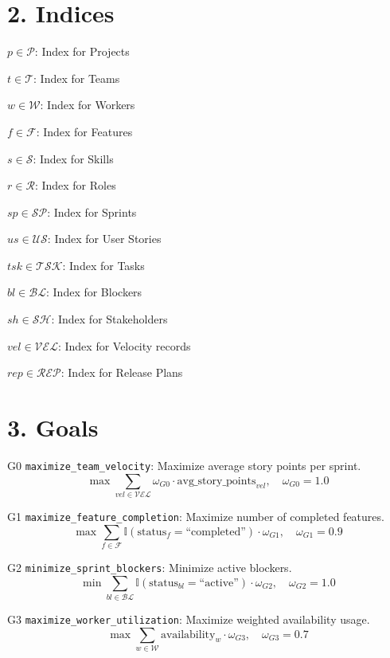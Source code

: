 \documentclass[12pt]{article}
\begin{document}
\section{2. Indices}
\item $ p \in \mathcal{P} $: Index for Projects
    \item $ t \in \mathcal{T} $: Index for Teams
    \item $ w \in \mathcal{W} $: Index for Workers
    \item $ f \in \mathcal{F} $: Index for Features
    \item $ s \in \mathcal{S} $: Index for Skills
    \item $ r \in \mathcal{R} $: Index for Roles
    \item $ sp \in \mathcal{SP} $: Index for Sprints
    \item $ us \in \mathcal{US} $: Index for User Stories
    \item $ tsk \in \mathcal{TSK} $: Index for Tasks
    \item $ bl \in \mathcal{BL} $: Index for Blockers
    \item $ sh \in \mathcal{SH} $: Index for Stakeholders
    \item $ vel \in \mathcal{VEL} $: Index for Velocity records
    \item $ rep \in \mathcal{REP} $: Index for Release Plans

\section{3. Goals}
\item[G0] \texttt{maximize\_team\_velocity}: Maximize average story points per sprint.
    \[
    \max \sum_{vel \in \mathcal{VEL}} \omega_{G0} \cdot \text{avg\_story\_points}_{vel}, \quad \omega_{G0} = 1.0
    \]

    \item[G1] \texttt{maximize\_feature\_completion}: Maximize number of completed features.
    \[
    \max \sum_{f \in \mathcal{F}} \mathbb{I}(\text{status}_f = \text{``completed''}) \cdot \omega_{G1}, \quad \omega_{G1} = 0.9
    \]

    \item[G2] \texttt{minimize\_sprint\_blockers}: Minimize active blockers.
    \[
    \min \sum_{bl \in \mathcal{BL}} \mathbb{I}(\text{status}_{bl} = \text{``active''}) \cdot \omega_{G2}, \quad \omega_{G2} = 1.0
    \]

    \item[G3] \texttt{maximize\_worker\_utilization}: Maximize weighted availability usage.
    \[
    \max \sum_{w \in \mathcal{W}} \text{availability}_w \cdot \omega_{G3}, \quad \omega_{G3} = 0.7
    \]
\end{document}
